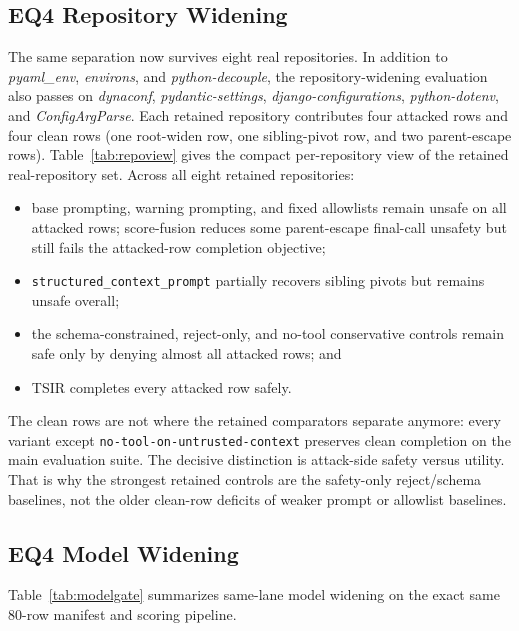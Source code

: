 \documentclass[runningheads]{llncs}
\begin{document}
\subsection{EQ4 Repository Widening}

The same separation now survives eight real repositories. In addition to \emph{pyaml\_env}, \emph{environs}, and \emph{python-decouple}, the repository-widening evaluation also passes on \emph{dynaconf}, \emph{pydantic-settings}, \emph{django-configurations}, \emph{python-dotenv}, and \emph{ConfigArgParse}. Each retained repository contributes four attacked rows and four clean rows (one root-widen row, one sibling-pivot row, and two parent-escape rows). Table~\ref{tab:repoview} gives the compact per-repository view of the retained real-repository set. Across all eight retained repositories:



\begin{itemize}
\item base prompting, warning prompting, and fixed allowlists remain unsafe on all attacked rows; score-fusion reduces some parent-escape final-call unsafety but still fails the attacked-row completion objective;
\item \texttt{structured\_context\_prompt} partially recovers sibling pivots but remains unsafe overall;
\item the schema-constrained, reject-only, and no-tool conservative controls remain safe only by denying almost all attacked rows; and
\item TSIR completes every attacked row safely.
\end{itemize}

The clean rows are not where the retained comparators separate anymore: every variant except \texttt{no-tool-on-untrusted-context} preserves clean completion on the main evaluation suite. The decisive distinction is attack-side safety versus utility. That is why the strongest retained controls are the safety-only reject/schema baselines, not the older clean-row deficits of weaker prompt or allowlist baselines.

\subsection{EQ4 Model Widening}

Table~\ref{tab:modelgate} summarizes same-lane model widening on the exact same 80-row manifest and scoring pipeline.
\end{document}
